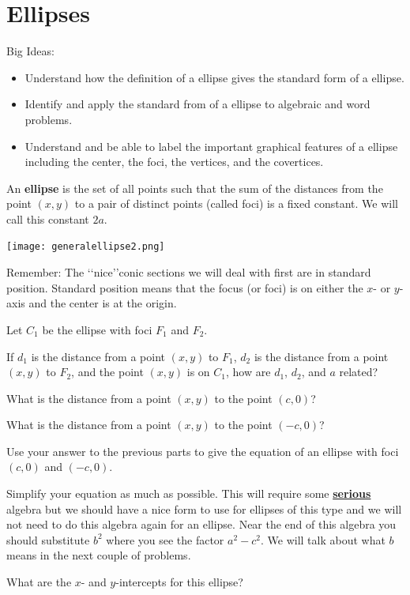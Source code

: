 \section{Ellipses}
Big Ideas:
\begin{itemize}
\item Understand how the definition of a ellipse gives the standard form of a ellipse.
\item Identify and apply the standard from of a ellipse to algebraic and word problems.
\item Understand and be able to label the important graphical features of a ellipse including the center, the foci, the vertices, and the covertices.
\end{itemize}
\begin{info} An \textbf{ellipse} is the set of all points such that the sum of the distances from the point $(x,y)$ to a pair of distinct points (called foci) is a fixed constant. We will call this constant $2a$.
\end{info}
\begin{center} \texttt{[image: generalellipse2.png]} \end{center}

Remember:  The \lq\lq nice\rq\rq conic sections we will deal with first are in standard position. Standard position means that the focus (or foci) is on either the $x$- or $y$-axis and the center is at the origin. 

\bq Let $C_1$ be the ellipse with foci $F_1$ and $F_2$. 
\be
\item If $d_1$ is the distance from a point $(x,y)$ to $F_1$, $d_2$ is the distance from a point $(x,y)$ to $F_2$, and the point $(x,y)$ is on $C_1$, how are $d_1$, $d_2$, and $a$ related?
\item What is the distance from a point $(x,y)$ to the point $(c,0)$?
\item What is the distance from a point $(x,y)$ to the point $(-c,0)$?
\item Use your answer to the previous parts to give the equation of an ellipse with foci $(c,0)$ and $(-c,0)$.
\item Simplify your equation as much as possible. This will require some \textbf{\underline{serious}} algebra but we should have a nice form to use for ellipses of this type and we will not need to do this algebra again for an ellipse. Near the end of this algebra you should substitute $b^2$ where you see the factor $a^2-c^2$. We will talk about what $b$ means in the next couple of problems.
\item What are the $x$- and $y$-intercepts for this ellipse?
\ee \eq

